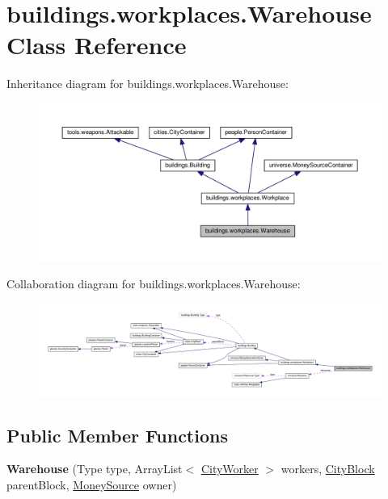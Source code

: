 \hypertarget{classbuildings_1_1workplaces_1_1_warehouse}{}\section{buildings.\+workplaces.\+Warehouse Class Reference}
\label{classbuildings_1_1workplaces_1_1_warehouse}


Inheritance diagram for buildings.\+workplaces.\+Warehouse\+:\nopagebreak
\begin{figure}[H]
\begin{center}
\leavevmode
\includegraphics[width=350pt]{classbuildings_1_1workplaces_1_1_warehouse__inherit__graph}
\end{center}
\end{figure}


Collaboration diagram for buildings.\+workplaces.\+Warehouse\+:
\nopagebreak
\begin{figure}[H]
\begin{center}
\leavevmode
\includegraphics[width=350pt]{classbuildings_1_1workplaces_1_1_warehouse__coll__graph}
\end{center}
\end{figure}
\subsection*{Public Member Functions}
\begin{DoxyCompactItemize}
\item 
{\bfseries Warehouse} (Type type, Array\+List$<$ \hyperlink{classpeople_1_1cityworkers_1_1_city_worker}{City\+Worker} $>$ workers, \hyperlink{classcities_1_1_city_block}{City\+Block} parent\+Block, \hyperlink{classuniverse_1_1_money_source}{Money\+Source} owner)\hypertarget{classbuildings_1_1workplaces_1_1_warehouse_a344a25354df3d3050da487076512a17a}{}\label{classbuildings_1_1workplaces_1_1_warehouse_a344a25354df3d3050da487076512a17a}

\end{DoxyCompactItemize}
